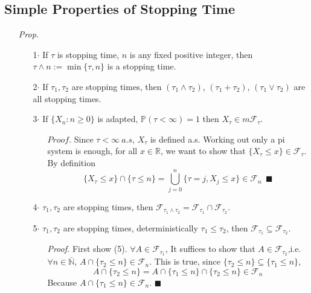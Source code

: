 \documentclass[a4paper,12pt,twoside]{book}
\begin{document}
\subsection{Simple Properties of Stopping Time}
\begin{itemize}
	\item[\textit{Prop.}]
	\begin{itemize}
		\item[1$\cdot$] If $\tau$ is stopping time, $n$ is any fixed positive integer, then $\tau \wedge n:=\min\{\tau, n\}$ is a stopping time.
		\item[2$\cdot$] If $\tau_1, \tau_2$ are stopping times, then $(\tau_1 \wedge \tau_2)$, $(\tau_1 + \tau_2)$, $(\tau_1 \vee \tau_2)$ are all stopping times.
		\item[3$\cdot$] If $\{X_n: n\geq 0\}$ is adapted, $\mathbb{P}\left(\tau<\infty\right)=1$ then $X_{\tau}\in m \mathcal{F}_{\tau}$.
		\begin{itemize}
			\item[$Proof.$] Since $\tau <\infty~a.s$, $X_{\tau}$ is defined a.s. Working out only a pi system is enough, for all $x\in \mathbb{R}$, we want to show that $\{X_{\tau}\leq x\}\in \mathcal{F}_{\tau}$. By definition
			\begin{equation}
				\{X_{\tau}\leq x\}\cap \{\tau\leq n\}= \bigcup_{j=0}^{n}\{\tau=j, X_j\leq x\}\in \mathcal{F}_n~~\blacksquare
			\end{equation}
		\end{itemize}
		\item[4$\cdot$] $\tau_1, \tau_2$ are stopping times, then $\mathcal{F}_{\tau_1 \wedge \tau_2}=\mathcal{F}_{\tau_1}\cap \mathcal{F}_{\tau_2}$.
		\item[5$\cdot$] $\tau_1, \tau_2$ are stopping times, deterministically $\tau_1\leq \tau_2$, then $\mathcal{F}_{\tau_1} \subseteq \mathcal{F}_{\tau_2}$.
		\begin{itemize}
			\item[\textit{Proof.}] First show (5). $\forall A \in \mathcal{F}_{\tau_1}$, It suffices to show that $A\in \mathcal{F}_{\tau_2}$,i.e. $\forall n\in \bar{\mathbb{N}}$, $A \cap \{\tau_2 \leq n\}\in \mathcal{F}_{n}$. This is true, since $\{\tau_2 \leq n\} \subseteq \{\tau_1 \leq n\}$,
			\begin{equation}
				A \cap \{\tau_2 \leq n\}=A\cap \{\tau_1 \leq n\}\cap \{\tau_2 \leq n\}\in \mathcal{F}_{n}
			\end{equation}
			Because $A \cap \{\tau_1 \leq n\}\in \mathcal{F}_n$. $\blacksquare$\newline

\end{itemize}
\end{itemize}
\end{itemize}
\end{document}
